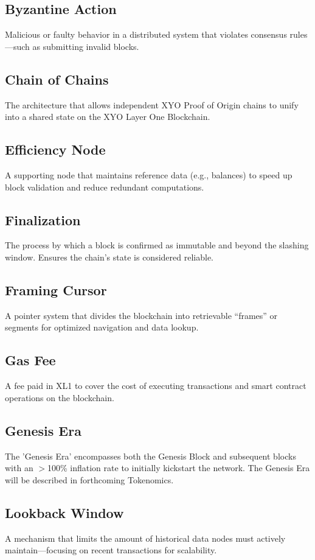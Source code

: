 \documentclass{article}
\begin{document}
\subsection*{Byzantine Action}
Malicious or faulty behavior in a distributed system that violates consensus rules—such as submitting invalid blocks.

\subsection*{Chain of Chains}
The architecture that allows independent XYO Proof of Origin chains to unify into a shared state on the XYO Layer One Blockchain.

\subsection*{Efficiency Node}
A supporting node that maintains reference data (e.g., balances) to speed up block validation and reduce redundant computations.

\subsection*{Finalization}
The process by which a block is confirmed as immutable and beyond the slashing window. Ensures the chain's state is considered reliable.

\subsection*{Framing Cursor}
A pointer system that divides the blockchain into retrievable “frames” or segments for optimized navigation and data lookup.

\subsection*{Gas Fee}
A fee paid in XL1 to cover the cost of executing transactions and smart contract operations on the blockchain.

\subsection*{Genesis Era}
The 'Genesis Era' encompasses both the Genesis Block and subsequent blocks with an $>$100\% inflation rate to initially kickstart the network. The Genesis Era will be described in forthcoming Tokenomics.

\subsection*{Lookback Window}
A mechanism that limits the amount of historical data nodes must actively maintain—focusing on recent transactions for scalability.
\end{document}
